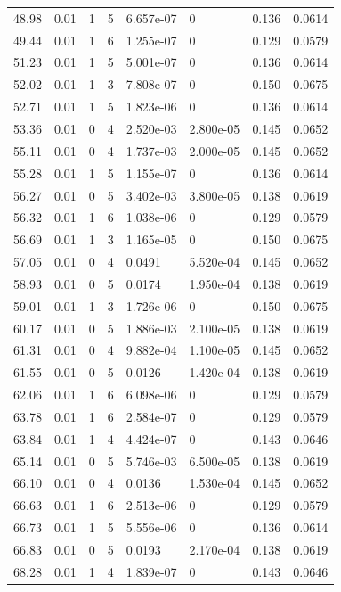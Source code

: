 \documentclass[preview]{standalone}
\begin{document}
{{{\begin{tabular}{L{1.2cm}C{1.2cm} C{0.3cm}C{0.5cm} C{1.4cm}C{1.4cm} C{1.4cm}C{1.4cm}}
  48.98  &  0.01  & 1     &  5 &  6.657e-07  & 0  & 0.136 &  0.0614   \\ 
  49.44  &  0.01  & 1     &  6 &  1.255e-07  & 0  & 0.129 &  0.0579   \\ 
  51.23  &  0.01  & 1     &  5 &  5.001e-07  & 0  & 0.136 &  0.0614   \\ 
  52.02  &  0.01  & 1     &  3 &  7.808e-07  & 0  & 0.150 &  0.0675   \\ 
  52.71  &  0.01  & 1     &  5 &  1.823e-06  & 0  & 0.136 &  0.0614   \\ 
  53.36  &  0.01  & 0     &  4 &  2.520e-03  & 2.800e-05  & 0.145 &  0.0652   \\ 
  55.11  &  0.01  & 0     &  4 &  1.737e-03  & 2.000e-05  & 0.145 &  0.0652   \\ 
  55.28  &  0.01  & 1     &  5 &  1.155e-07  & 0  & 0.136 &  0.0614   \\ 
  56.27  &  0.01  & 0     &  5 &  3.402e-03  & 3.800e-05  & 0.138 &  0.0619   \\ 
  56.32  &  0.01  & 1     &  6 &  1.038e-06  & 0  & 0.129 &  0.0579   \\ 
  56.69  &  0.01  & 1     &  3 &  1.165e-05  & 0  & 0.150 &  0.0675   \\ 
  57.05  &  0.01  & 0     &  4 &  0.0491  & 5.520e-04  & 0.145 &  0.0652   \\ 
  58.93  &  0.01  & 0     &  5 &  0.0174  & 1.950e-04  & 0.138 &  0.0619   \\ 
  59.01  &  0.01  & 1     &  3 &  1.726e-06  & 0  & 0.150 &  0.0675   \\ 
  60.17  &  0.01  & 0     &  5 &  1.886e-03  & 2.100e-05  & 0.138 &  0.0619   \\ 
  61.31  &  0.01  & 0     &  4 &  9.882e-04  & 1.100e-05  & 0.145 &  0.0652   \\ 
  61.55  &  0.01  & 0     &  5 &  0.0126  & 1.420e-04  & 0.138 &  0.0619   \\ 
  62.06  &  0.01  & 1     &  6 &  6.098e-06  & 0  & 0.129 &  0.0579   \\ 
  63.78  &  0.01  & 1     &  6 &  2.584e-07  & 0  & 0.129 &  0.0579   \\ 
  63.84  &  0.01  & 1     &  4 &  4.424e-07  & 0  & 0.143 &  0.0646   \\ 
  65.14  &  0.01  & 0     &  5 &  5.746e-03  & 6.500e-05  & 0.138 &  0.0619   \\ 
  66.10  &  0.01  & 0     &  4 &  0.0136  & 1.530e-04  & 0.145 &  0.0652   \\ 
  66.63  &  0.01  & 1     &  6 &  2.513e-06  & 0  & 0.129 &  0.0579   \\ 
  66.73  &  0.01  & 1     &  5 &  5.556e-06  & 0  & 0.136 &  0.0614   \\ 
  66.83  &  0.01  & 0     &  5 &  0.0193  & 2.170e-04  & 0.138 &  0.0619   \\ 
  68.28  &  0.01  & 1     &  4 &  1.839e-07  & 0  & 0.143 &  0.0646   \\ 
\hline 
\end{tabular} 

}}}
\end{document}
